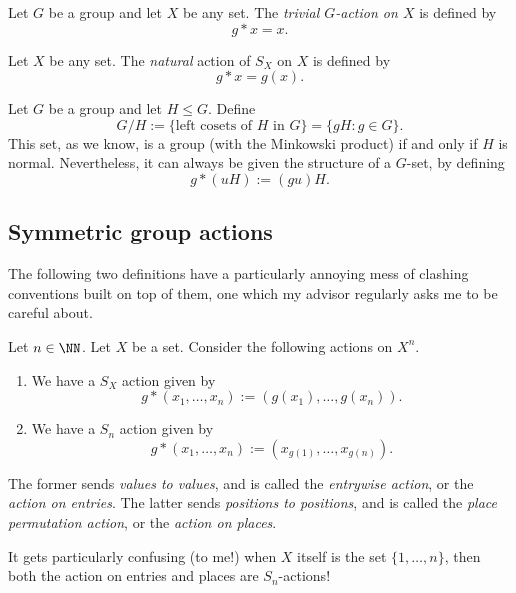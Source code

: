 \documentclass{article}
\begin{document}
\begin{example}
    Let $G$ be a group and let $X$ be any set.
    The \textit{trivial $G$-action on $X$} is defined by
    \[
        g \ast x = x.
    \]
\end{example}

\begin{example}
    Let $X$ be any set.
    The \textit{natural} action of $S_X$ on $X$ is defined by
    \[
        g \ast x = g(x).
    \]
\end{example}

\begin{example}\label{ex:cosetgset}
    Let $G$ be a group and let $H \leq G$.
    Define
    \[
        G / H := \{\text{left cosets of }H\text{ in }G\} = \{gH : g \in G\}.
    \]
    This set, as we know, is a group (with the Minkowski product) if and only if $H$ is normal.
    Nevertheless, it can always be given the structure of a $G$-set, by defining
    \[
        g \ast (uH) := (gu)H.
    \]
\end{example}

\subsection{Symmetric group actions}

The following two definitions have a particularly annoying mess of clashing conventions built on top of them, one which my advisor regularly asks me to be careful about.

\begin{definition}
    Let $n \in \NN$.
    Let $X$ be a set.
    Consider the following actions on $X^n$.
    \begin{enumerate}[label=(\alph*)]
        \item We have a $S_X$ action given by
            \[
                g \ast (x_1,\ldots,x_n) := (g(x_1),\ldots,g(x_n)).
            \]
        \item We have a $S_n$ action given by
            \[
                g \ast (x_1,\ldots,x_n) := (x_{g(1)},\ldots,x_{g(n)}).
            \]
    \end{enumerate}
    The former sends \textit{values to values}, and is called the \textit{entrywise action}, or the \textit{action on entries}.
    The latter sends \textit{positions to positions}, and is called the \textit{place permutation action}, or the \textit{action on places}.
\end{definition}

It gets particularly confusing (to me!) when $X$ itself is the set $\{1, \ldots, n\}$, then both the action on entries and places are $S_n$-actions!
\end{document}
